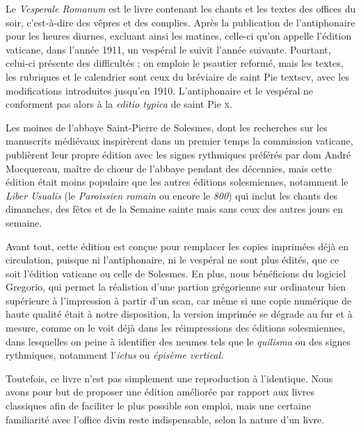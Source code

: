 
\begin{frpars}
Le \textit{Vesperale Romanum} est le livre contenant les chants et les textes des offices du soir, c’est-à-dire des vêpres et des complies. Après la publication de l'antiphonaire pour les heures diurnes, excluant ainsi les matines, celle-ci qu'on appelle l'édition vaticane, dans l'année 1911, un vespéral le suivit l'année suivante. Pourtant, celui-ci présente des difficultés ; on emploie le psautier reformé, mais les textes, les rubriques et le calendrier sont ceux du bréviaire de saint Pie textsc{v}, avec les modifications introduites jusqu'en 1910. L'antiphonaire et le vespéral ne conforment pas alors à la \textit{editio typica} de saint Pie \textsc{x}.

Les moines de l'abbaye Saint-Pierre de Solesmes, dont les recherches sur les manuscrits médiévaux inspirèrent dans un premier temps la commission vaticane, publièrent leur propre édition avec les signes rythmiques préférés par dom André Mocquereau, maître de chœur de l'abbaye pendant des décennies, mais cette édition était moins populaire que les autres éditions solesmiennes, notamment le \textit{Liber Usualis} (le \textit{Paroissien romain} ou encore le \textit{800}) qui inclut les chants des dimanches, des fêtes et de la Semaine sainte mais sans ceux des autres jours en semaine.


Avant tout, cette édition est conçue pour remplacer les copies imprimées déjà en circulation, puisque ni l'antiphonaire, ni le vespéral ne sont plus édités, que ce soit l'édition vaticane ou celle de Solesmes. En plus, nous bénéficions du logiciel Gregorio, qui permet la réalistion d'une partion grégorienne sur ordinateur bien supérieure à l'impression à partir d'un scan, car même si une copie numérique de haute qualité était à notre disposition, la version imprimée se dégrade au fur et à mesure, comme on le voit déjà dans les réimpressions des éditions solesmiennes, dans lesquelles on peine à identifier des neumes tels que le \textit{quilisma} ou des signes rythmiques, notamment l'\textit{ictus} ou \textit{épisème vertical.}

Toutefois, ce livre n'est pas simplement une reproduction à l'identique. Nous avons pour but de proposer une édition améliorée par rapport aux livres classiques afin de faciliter le plus possible son emploi, mais une certaine familiarité avec l'office divin reste indispensable, selon la nature d'un livre.


\end{frpars}
